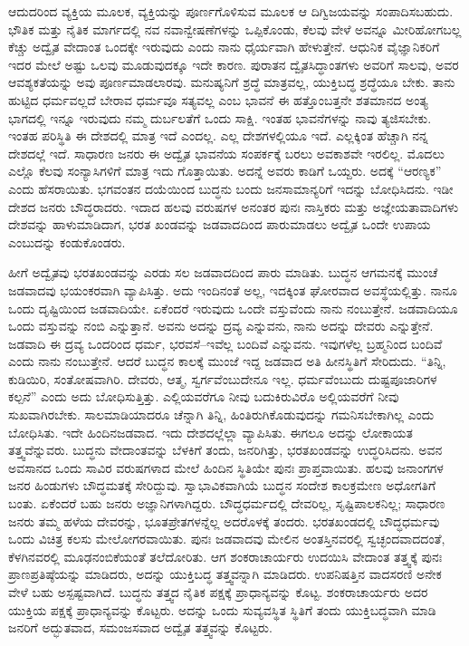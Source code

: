 \vskip 0.2cm 

ಆದುದರಿಂದ ವ್ಯಕ್ತಿಯ ಮೂಲಕ, ವ್ಯಕ್ತಿಯನ್ನು ಪೂರ್ಣಗೊಳಿಸುವ ಮೂಲಕ ಆ ದಿಗ್ವಿಜಯವನ್ನು ಸಂಪಾದಿಸಬಹುದು. ಭೌತಿಕ ಮತ್ತು ನೈತಿಕ ಮಾರ್ಗದಲ್ಲಿ ನವ ನವಾನ್ವೇಷಣೆಗಳನ್ನು ಒಪ್ಪಿಕೊಂಡು, ಕೆಲವು ವೇಳೆ ಅವನ್ನೂ ಮೀರಿಹೋಗಬಲ್ಲ ಕೆಚ್ಚು ಅದ್ವೈತ ವೇದಾಂತ ಒಂದಕ್ಕೇ ಇರುವುದು ಎಂದು ನಾನು ಧೈರ್ಯವಾಗಿ ಹೇಳುತ್ತೇನೆ. ಆಧುನಿಕ ವೈಜ್ಞಾನಿಕರಿಗೆ ಇದರ ಮೇಲೆ ಅಷ್ಟು ಒಲವು ಮೂಡುವುದಕ್ಕೂ ಇದೇ ಕಾರಣ. ಪುರಾತನ ದ್ವೈತಸಿದ್ಧಾಂತಗಳು ಅವರಿಗೆ ಸಾಲವು, ಅವರ ಆವಶ್ಯಕತೆಯನ್ನು ಅವು ಪೂರ್ಣಮಾಡಲಾರವು. ಮನುಷ್ಯನಿಗೆ ಶ್ರದ್ಧೆ ಮಾತ್ರವಲ್ಲ, ಯುಕ್ತಿಬದ್ಧ ಶ್ರದ್ಧೆಯೂ ಬೇಕು. ತಾನು ಹುಟ್ಟಿದ ಧರ್ಮವಲ್ಲದೆ ಬೇರಾವ ಧರ್ಮವೂ ಸತ್ಯವಲ್ಲ ಎಂಬ ಭಾವನೆ ಈ ಹತ್ತೊಂಬತ್ತನೇ ಶತಮಾನದ ಅಂತ್ಯ ಭಾಗದಲ್ಲಿ ಇನ್ನೂ ಇರುವುದು ನಮ್ಮ ದುರ್ಬಲತೆಗೆ ಒಂದು ಸಾಕ್ಷಿ. ಇಂತಹ ಭಾವನೆಗಳನ್ನು ನಾವು ತ್ಯಜಿಸಬೇಕು. ಇಂತಹ ಪರಿಸ್ಥಿತಿ ಈ ದೇಶದಲ್ಲಿ ಮಾತ್ರ ಇದೆ ಎಂದಲ್ಲ. ಎಲ್ಲ ದೇಶಗಳಲ್ಲಿಯೂ ಇದೆ. ಎಲ್ಲಕ್ಕಿಂತ ಹೆಚ್ಚಾಗಿ ನನ್ನ ದೇಶದಲ್ಲೆ ಇದೆ. ಸಾಧಾರಣ ಜನರು ಈ ಅದ್ವೈತ ಭಾವನೆಯ ಸಂಪರ್ಕಕ್ಕೆ ಬರಲು ಅವಕಾಶವೇ ಇರಲಿಲ್ಲ. ಮೊದಲು ಎಲ್ಲೊ ಕೆಲವು ಸಂನ್ಯಾಸಿಗಳಿಗೆ ಮಾತ್ರ ಇದು ಗೊತ್ತಾಯಿತು. ಅದನ್ನೆ ಅವರು ಕಾಡಿಗೆ ಒಯ್ದರು. ಅದಕ್ಕೆ “ಆರಣ್ಯಕ” ಎಂದು ಹೆಸರಾಯಿತು. ಭಗವಂತನ ದಯೆಯಿಂದ ಬುದ್ಧನು ಬಂದು ಜನಸಾಮಾನ್ಯರಿಗೆ ಇದನ್ನು ಬೋಧಿಸಿದನು. ಇಡೀ ದೇಶದ ಜನರು ಬೌದ್ಧರಾದರು. ಇದಾದ ಹಲವು ವರುಷಗಳ ಅನಂತರ ಪುನಃ ನಾಸ್ತಿಕರು ಮತ್ತು ಅಜ್ಞೇಯತಾವಾದಿಗಳು ದೇಶವನ್ನು ಹಾಳುಮಾಡಿದಾಗ, ಭರತ ಖಂಡವನ್ನು ಜಡವಾದದಿಂದ ಪಾರುಮಾಡಲು ಅದ್ವೈತ ಒಂದೇ ಉಪಾಯ ಎಂಬುದನ್ನು ಕಂಡುಕೊಂಡರು.

\vskip 0.2cm 

ಹೀಗೆ ಅದ್ವೈತವು ಭರತಖಂಡವನ್ನು ಎರಡು ಸಲ ಜಡವಾದದಿಂದ ಪಾರು ಮಾಡಿತು. ಬುದ್ಧನ ಆಗಮನಕ್ಕೆ ಮುಂಚೆ ಜಡವಾದವು ಭಯಂಕರವಾಗಿ ವ್ಯಾಪಿಸಿತ್ತು. ಅದು ಇಂದಿನಂತೆ ಅಲ್ಲ, ಇದಕ್ಕಿಂತ ಘೋರವಾದ ಅವಸ್ಥೆಯಲ್ಲಿತ್ತು. ನಾನೂ ಒಂದು ದೃಷ್ಟಿಯಿಂದ ಜಡವಾದಿಯೇ. ಏಕೆಂದರೆ ಇರುವುದು ಒಂದೇ ವಸ್ತುವೆಂದು ನಾನು ನಂಬುತ್ತೇನೆ. ಜಡವಾದಿಯೂ ಒಂದು ವಸ್ತುವನ್ನು ನಂಬಿ ಎನ್ನುತ್ತಾನೆ. ಅವನು ಅದನ್ನು ದ್ರವ್ಯ ಎನ್ನುವನು, ನಾನು ಅದನ್ನು ದೇವರು ಎನ್ನುತ್ತೇನೆ. ಜಡವಾದಿ ಈ ದ್ರವ್ಯ ಒಂದರಿಂದ ಧರ್ಮ, ಭರವಸೆ–ಇವೆಲ್ಲ ಬಂದಿವೆ ಎನ್ನುವನು. ಇವುಗಳೆಲ್ಲ ಬ್ರಹ್ಮನಿಂದ ಬಂದಿವೆ ಎಂದು ನಾನು ನಂಬುತ್ತೇನೆ. ಆದರೆ ಬುದ್ಧನ ಕಾಲಕ್ಕೆ ಮುಂಜೆ ಇದ್ದ ಜಡವಾದ ಅತಿ ಹೀನಸ್ಥಿತಿಗೆ ಸೇರಿದುದು. “ತಿನ್ನಿ, ಕುಡಿಯಿರಿ, ಸಂತೋಷವಾಗಿರಿ. ದೇವರು, ಆತ್ಮ, ಸ್ವರ್ಗವೆಂಬುದೇನೂ ಇಲ್ಲ. ಧರ್ಮವೆಂಬುದು ದುಷ್ಟಪೂಜಾರಿಗಳ ಕಲ್ಪನೆ” ಎಂದು ಅದು ಬೋಧಿಸುತ್ತಿತ್ತು. ಎಲ್ಲಿಯವರೆಗೂ ನೀವು ಬದುಕಿರುವಿರೊ ಅಲ್ಲಿಯವರೆಗೆ ನೀವು ಸುಖವಾಗಿರಬೇಕು. ಸಾಲಮಾಡಿಯಾದರೂ ಚೆನ್ನಾಗಿ ತಿನ್ನಿ, ಹಿಂತಿರುಗಿಕೊಡುವುದನ್ನು ಗಮನಿಸಬೇಕಾಗಿಲ್ಲ ಎಂದು ಬೋಧಿಸಿತು. ಇದೇ ಹಿಂದಿನ\break ಜಡವಾದ. ಇದು ದೇಶದಲ್ಲೆಲ್ಲಾ ವ್ಯಾಪಿಸಿತು. ಈಗಲೂ ಅದನ್ನು ಲೋಕಾಯತ ತತ್ತ್ವವೆನ್ನುವರು. ಬುದ್ಧನು ವೇದಾಂತವನ್ನು ಬೆಳಕಿಗೆ ತಂದು, ಜನರಿಗಿತ್ತು, ಭರತಖಂಡವನ್ನು ಉದ್ಧರಿಸಿದನು. ಅವನ ಅವಸಾನದ ಒಂದು ಸಾವಿರ ವರುಷಗಳಾದ ಮೇಲೆ ಹಿಂದಿನ ಸ್ಥಿತಿಯೇ ಪುನಃ ಪ್ರಾಪ್ತವಾಯಿತು. ಹಲವು ಜನಾಂಗಗಳ ಜನರ ಹಿಂಡುಗಳು ಬೌದ್ಧಮತಕ್ಕೆ ಸೇರಿದ್ದುವು. ಸ್ವಾಭಾವಿಕವಾಗಿಯೆ ಬುದ್ಧನ ಸಂದೇಶ ಕಾಲಕ್ರಮೇಣ ಅಧೋಗತಿಗೆ ಬಂತು. ಏಕೆಂದರೆ ಬಹು ಜನರು ಅಜ್ಞಾನಿಗಳಾಗಿದ್ದರು. ಬೌದ್ಧಧರ್ಮದಲ್ಲಿ ದೇವರಿಲ್ಲ, ಸೃಷ್ಟಿಪಾಲಕನಿಲ್ಲ; ಸಾಧಾರಣ ಜನರು ತಮ್ಮ ಹಳೆಯ ದೇವರನ್ನು, ಭೂತಪ್ರೇತಗಳನ್ನೆಲ್ಲ ಅದರೊಳಕ್ಕೆ ತಂದರು. ಭರತಖಂಡದಲ್ಲಿ ಬೌದ್ಧಧರ್ಮವು ಒಂದು ವಿಚಿತ್ರ ಕಲಸು ಮೇಲೋಗರವಾಯಿತು. ಪುನಃ ಜಡವಾದವು ಮೇಲಿನ ಅಂತಸ್ತಿನವರಲ್ಲಿ ಸ್ವಚ್ಛಂದವಾದದಂತೆ, ಕೆಳಗಿನವರಲ್ಲಿ ಮೂಢನಂಬಿಕೆಯಂತೆ ತಲೆದೋರಿತು. ಆಗ ಶಂಕರಾಚಾರ್ಯರು ಉದಯಿಸಿ ವೇದಾಂತ ತತ್ತ್ವಕ್ಕೆ ಪುನಃ ಪ್ರಾಣಪ್ರತಿಷ್ಠೆಯನ್ನು ಮಾಡಿದರು, ಅದನ್ನು ಯುಕ್ತಿಬದ್ಧ ತತ್ತ್ವವನ್ನಾಗಿ ಮಾಡಿದರು. ಉಪನಿಷತ್ತಿನ ವಾದಸರಣಿ ಅನೇಕ ವೇಳೆ ಬಹು ಅಸ್ಪಷ್ಟವಾಗಿದೆ. ಬುದ್ಧನು ತತ್ತ್ವದ ನೈತಿಕ ಪಕ್ಷಕ್ಕೆ ಪ್ರಾಧಾನ್ಯವನ್ನು ಕೊಟ್ಟ. ಶಂಕರಾಚಾರ್ಯರು ಅದರ ಯುಕ್ತಿಯ ಪಕ್ಷಕ್ಕೆ ಪ್ರಾಧಾನ್ಯವನ್ನು ಕೊಟ್ಟರು. ಅದನ್ನು ಒಂದು ಸುವ್ಯವಸ್ಥಿತ ಸ್ಥಿತಿಗೆ ತಂದು ಯುಕ್ತಿಬದ್ಧವಾಗಿ ಮಾಡಿ ಜನರಿಗೆ ಅದ್ಭುತವಾದ, ಸಮಂಜಸವಾದ ಅದ್ವೈತ ತತ್ತ್ವವನ್ನು ಕೊಟ್ಟರು.

